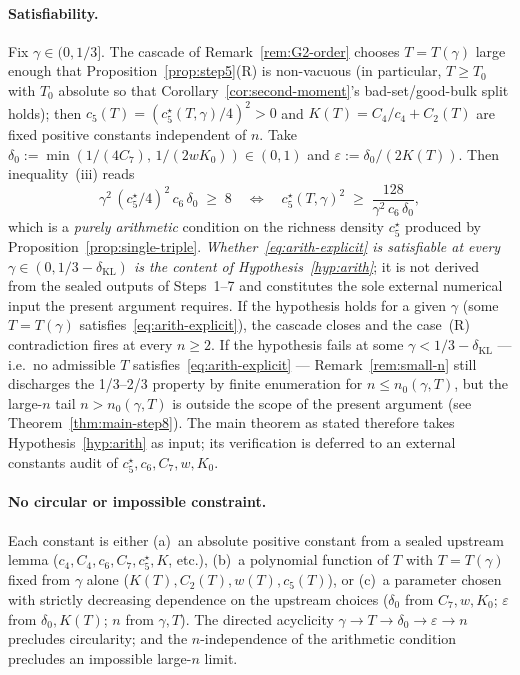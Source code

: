 \begin{remark}
\paragraph{Satisfiability.} Fix $\gamma\in(0,1/3]$. The cascade of
Remark~\ref{rem:G2-order} chooses $T=T(\gamma)$ large enough that
Proposition~\ref{prop:step5}(R) is non-vacuous (in particular,
$T\ge T_0$ with $T_0$ absolute so that Corollary~\ref{cor:second-moment}'s
bad-set/good-bulk split holds); then
$c_5(T) = (c_5^\star(T,\gamma)/4)^2 > 0$ and $K(T) = C_4/c_4 + C_2(T)$
are fixed positive constants independent of $n$. Take
$\delta_0 := \min(1/(4C_7),\,1/(2wK_0))\in(0,1)$ and
$\varepsilon := \delta_0/(2K(T))$. Then inequality~(iii) reads
\begin{equation}\label{eq:arith-explicit}
 \gamma^2\,(c_5^\star/4)^2\,c_6\,\delta_0 \;\ge\; 8
 \quad\Longleftrightarrow\quad
 c_5^\star(T,\gamma)^2 \;\ge\; \frac{128}{\gamma^2\,c_6\,\delta_0},
\end{equation}
which is a \emph{purely arithmetic} condition on the richness density
$c_5^\star$ produced by Proposition~\ref{prop:single-triple}.
\emph{Whether~\eqref{eq:arith-explicit} is satisfiable at every
$\gamma \in (0, 1/3 - \delta_{\mathrm{KL}})$ is the content of
Hypothesis~\ref{hyp:arith}}; it is not derived from the sealed
outputs of Steps~1--7 and constitutes the sole external
numerical input the present argument requires. If the hypothesis
holds for a given $\gamma$ (some $T = T(\gamma)$
satisfies~\eqref{eq:arith-explicit}), the cascade closes and the
case~(R) contradiction fires at every $n\ge2$. If the hypothesis
fails at some $\gamma < 1/3 - \delta_{\mathrm{KL}}$ --- i.e.\ no
admissible $T$ satisfies~\eqref{eq:arith-explicit} ---
Remark~\ref{rem:small-n} still discharges the 1/3--2/3 property by
finite enumeration for $n \le n_0(\gamma, T)$, but the large-$n$
tail $n > n_0(\gamma, T)$ is outside the scope of the present
argument (see Theorem~\ref{thm:main-step8}). The main theorem as
stated therefore takes Hypothesis~\ref{hyp:arith} as input; its
verification is deferred to an external constants audit of
$c_5^\star, c_6, C_7, w, K_0$.

\paragraph{No circular or impossible constraint.} Each constant is
either (a)~an absolute positive constant from a sealed upstream lemma
($c_4, C_4, c_6, C_7, c_5^\star, K$, etc.), (b)~a polynomial function
of $T$ with $T=T(\gamma)$ fixed from $\gamma$ alone ($K(T), C_2(T),
w(T), c_5(T)$), or (c)~a parameter chosen with strictly decreasing
dependence on the upstream choices ($\delta_0$ from $C_7,w,K_0$;
$\varepsilon$ from $\delta_0,K(T)$; $n$ from $\gamma,T$). The
directed acyclicity $\gamma\to T\to\delta_0\to\varepsilon\to n$
precludes circularity; and the $n$-independence of the arithmetic
condition precludes an impossible large-$n$ limit.
\end{remark}

